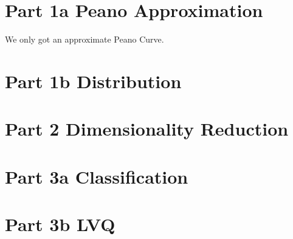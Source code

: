 \documentclass[11pt,a4paper]{article}
\begin{document}
\begin{titlepage}
    \maketitle
\end{titlepage}

\section{Part 1a Peano Approximation}
We only got an approximate Peano Curve.

\section{Part 1b Distribution}


\section{Part 2 Dimensionality Reduction}

\section{Part 3a Classification}

\section{Part 3b LVQ}

\end{document}
